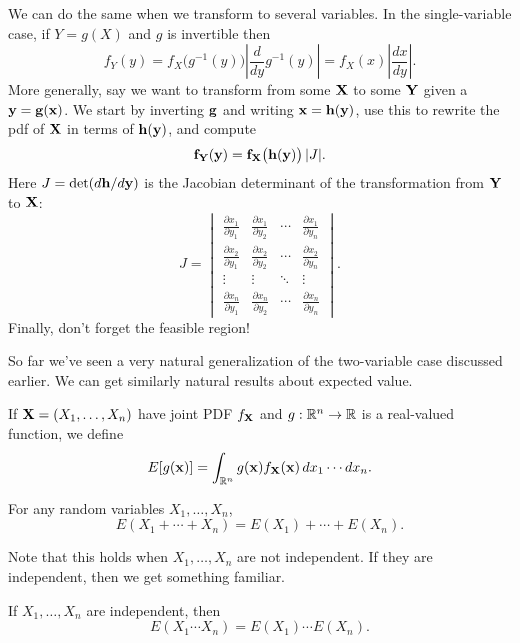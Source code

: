 \documentclass[../m157main.tex]{subfiles}
\begin{document}
We can do the same when we transform to several variables.
In the single-variable case, if $Y = g(X)$ and $g$ is invertible then
\[ f_Y(y) = f_X \big( g^{-1}(y) \big) \left| \frac{d}{dy} g^{-1}(y) \right| = f_X(x) \left| \frac{dx}{dy} \right|. \]
More generally, say we want to transform from some $\mathbf{X}$ to some $\mathbf{Y}$ given a $\mathbf{y} = \mathbf{g}(\mathbf{x})$.
We start by inverting $\mathbf{g}$ and writing $\mathbf{x} = \mathbf{h}(\mathbf{y})$, use this to rewrite the pdf of $\mathbf{X}$ in terms of $\mathbf{h}(\mathbf{y})$, and compute
\[ \mathbf{f}_{\mathbf{Y}}(\mathbf{y}) = \mathbf{f}_{\mathbf{X}} \big( \mathbf{h}(\mathbf{y}) \big) \,|J|. \]
Here $J = \det (d\mathbf{h} / d\mathbf{y})$ is the Jacobian determinant of the transformation from $\mathbf{Y}$ to $\mathbf{X}$:
\[ J = \begin{vmatrix} \frac{\partial x_1}{\partial y_1} & \frac{\partial x_1}{\partial y_2} & \cdots & \frac{\partial x_1}{\partial y_n} \\[6pt] \frac{\partial x_2}{\partial y_1} & \frac{\partial x_2}{\partial y_2} & \cdots & \frac{\partial x_2}{\partial y_n} \\ \vdots & \vdots & \ddots & \vdots \\ \frac{\partial x_n}{\partial y_1} & \frac{\partial x_n}{\partial y_2} & \cdots & \frac{\partial x_n}{\partial y_n} \end{vmatrix}. \]
Finally, don't forget the feasible region!

So far we've seen a very natural generalization of the two-variable case discussed earlier.
We can get similarly natural results about expected value.

\begin{definition}
    If $\mathbf{X} = (X_1, \ldots, X_n)$ have joint PDF $f_{\mathbf{X}}$ and $g : \mathbb{R}^n \to \mathbb{R}$ is a real-valued function, we define
    \[ E[g(\mathbf{x})] = \int_{\mathbb{R}^n} g(\mathbf{x}) f_{\mathbf{X}}(\mathbf{x}) \,dx_1 \cdots dx_n. \]
\end{definition}

\begin{theorem}
    For any random variables $X_1, \ldots, X_n$,
    \[ E(X_1 + \cdots + X_n) = E(X_1) + \cdots + E(X_n). \]
\end{theorem}

Note that this holds when $X_1, \ldots, X_n$ are not independent.
If they are independent, then we get something familiar.

\begin{theorem}
    If $X_1, \ldots, X_n$ are independent, then
    \[ E(X_1 \cdots X_n) = E(X_1) \cdots E(X_n). \]
\end{theorem}
\end{document}

